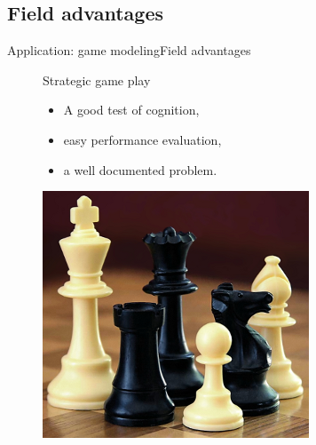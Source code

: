 \subsection{Field advantages}
\begin{frame}{Application: game modeling}{Field advantages}

\begin{figure}[ht]
\begin{minipage}[t]{0.5\linewidth}
\vspace{0pt}
\begin{block}{Strategic game play}
\begin{itemize}
\item A good test of cognition,
\item easy performance evaluation,
\item a well documented problem.
\end{itemize}
\end{block}
\end{minipage}
\hfill
\begin{minipage}[t]{0.4\linewidth}
\vspace{0pt}
\centering
\includegraphics[width=\textwidth]{img/application/chess.png}
\end{minipage}
\end{figure}

\end{frame}

